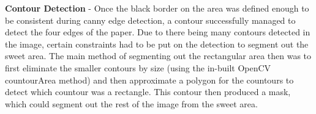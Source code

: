 \textbf{Contour Detection} - 
%
Once the black border on the area was defined enough to be consistent during canny edge detection, a contour successfully managed to detect the four edges of the paper. Due to there being many contours detected in the image, certain constraints had to be put on the detection to segment out the sweet area. The main method of segmenting out the rectangular area then was to first eliminate the smaller contours by size (using the in-built OpenCV countourArea method) and then approximate a polygon for the countours to detect which countour was a rectangle. This contour then produced a mask, which could segment out the rest of the image from the sweet area.
